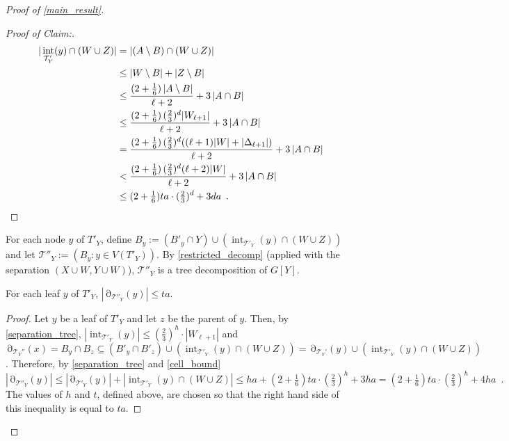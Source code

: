 \documentclass{patmorin}
\newenvironment{clmproof}{\begin{proof}[Proof of Claim:]\renewcommand{\qedsymbol}{\rule{1ex}{1ex}}}{\end{proof}}
\DeclareMathOperator{\interior}{int}
\DeclareMathOperator{\boundary}{\partial}
\begin{document}
\begin{proof}[Proof of \cref{main_result}]
\begin{clmproof}
  \begin{align*}
  |\interior_{\mathcal{T}'_Y}(y)\cap (W\cup Z)| 
  & = |(A\setminus B)\cap (W\cup Z)| \\
  & \le |W\setminus B| + |Z\setminus B| \\
  & \le 
     \frac{(2+\tfrac{1}{6})\,|A\setminus B|}{\ell+2} + 3\,|A\cap B| \\
  & \le \frac{(2+\tfrac{1}{6})\,(\tfrac{2}{3})^d|W_{\ell+1}|}{\ell+2} + 3\,|A\cap B| \\
  & = \frac{(2+\tfrac{1}{6})\,(\tfrac{2}{3})^d((\ell+1)|W|+|\Delta_{\ell+1}|)}{\ell+2} + 3\,|A\cap B| \\
  & < \frac{(2+\tfrac{1}{6})\,(\tfrac{2}{3})^d(\ell+2)|W|}{\ell+2} + 3\,|A\cap B| \\
  & \le (2+\tfrac{1}{6})ta\cdot(\tfrac{2}{3})^d + 3da \enspace . \qedhere
  \end{align*}
  \end{clmproof}

 For each node $y$ of $T'_Y$, define $B_y:=(B'_y\cap Y) \cup (\interior_{\mathcal{T}'_Y}(y)\cap (W\cup Z))$ and let $\mathcal{T}''_Y:=(B_y:y\in V(T'_Y))$.  By \cref{restricted_decomp} (applied with the separation $(X\cup W,Y\cup W)$), $\mathcal{T}''_Y$ is a tree decomposition of $G[Y]$.

 \begin{clm}\label{leaf_interface}
    For each leaf $y$ of $T'_Y$, $|\boundary_{\mathcal{T}''_Y}(y)|\le ta$.
 \end{clm}
 \begin{proof}
   Let $y$ be a leaf of $T'_Y$ and let $z$ be the parent of $y$.  Then, by \cref{separation_tree}, $|\interior_{\mathcal{T}'_Y}(y)|\le (\tfrac{2}{3})^h\cdot |W_{\ell+1}|$ and $\boundary_{\mathcal{T}_Y''}(x)=B_y\cap B_z\subseteq (B'_y\cap B'_z)\cup(\interior_{\mathcal{T}'_Y}(y)\cap (W\cup Z)) = \boundary_{\mathcal{T}_Y'}(y)\cup(\interior_{\mathcal{T}'_Y}(y)\cap (W\cup Z))$. Therefore, by \cref{separation_tree} and \cref{cell_bound}
   \[
     |\boundary_{\mathcal{T}''_Y}(y)| \le |\boundary_{\mathcal{T}'_Y}(y)| + |\interior_{\mathcal{T}'_Y}(y)\cap (W\cup Z)| \le ha + (2+\tfrac{1}{6})ta\cdot(\tfrac{2}{3})^{h} + 3ha =  (2+\tfrac{1}{6})ta\cdot(\tfrac{2}{3})^{h} + 4ha\enspace .
   \]
   The values of $h$ and $t$, defined above, are chosen so that the right hand side of this inequality is equal to $ta$.
 \end{proof}


\end{proof}
\end{document}
